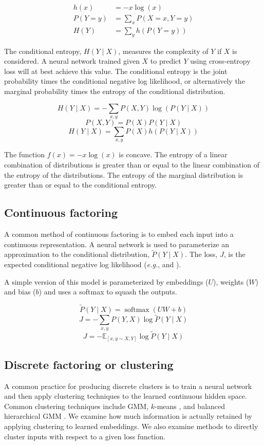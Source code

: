 \documentclass[11pt,letterpaper]{article}
\begin{document}
\begin{align*}
h(x) &= -x \log(x) \\
P(Y=y) &= \sum_x P(X=x, Y=y) \\
H(Y) &=  \sum_y h(P(Y=y))
\end{align*}

The conditional entropy, $H(Y \mid X)$, measures the complexity of $Y$ if $X$ is considered. A neural network trained given $X$ to predict $Y$ using cross-entropy loss will at best achieve this value. The conditional entropy is the joint probability times the conditional negative log likelihood, or alternatively the marginal probability times the entropy of the conditional distribution.

$$H(Y \mid X)=-\sum_{x,y} P(X, Y) \log(P(Y \mid X)) $$
$$P(X,Y) = P(X) P(Y \mid X)$$
$$H(Y \mid X)= \sum_{x,y}  P(X) h(P(Y \mid X))$$

The function $f(x)=-x \log(x)$ is concave. The entropy of a linear combination of distributions is greater than or equal to the linear combination of the entropy of the distributions. The entropy of the marginal distribution is greater than or equal to the conditional entropy.

\subsection{Continuous factoring}

A common method of continuous factoring is to embed each input into a continuous representation. A neural network is used to parameterize an approximation to the conditional distribution, $\tilde{P}(Y \mid X)$. The loss, $J$, is the expected conditional negative log likelihood (\textit{e.g.}, \cite{MikolovSCCD13} and \cite{Mikolov1301}).

A simple version of this model is parameterized by embeddings ($U$), weights ($W$) and bias ($b$) and uses a softmax to squash the outputs.

$$ \tilde{P}(Y\mid X) = \operatorname{softmax}(U W+b)$$
$$ J = -\sum_{x, y} P(Y,X) \log \tilde{P}(Y \mid X) $$
$$ J = -\mathbb{E}_{[x,y \sim X, Y]} \log \tilde{P}(Y \mid X) $$

\subsection{Discrete factoring or clustering}

A common practice for producing discrete clusters is to train a neural network and then apply clustering techniques to the learned continuous hidden space. Common clustering techniques include GMM, $k$-means \cite{Lloyd:2006:LSQ:2263356.2269955}, and balanced hierarchical GMM \cite{NIPS2008_3583}. We examine how much information is actually retained by applying clustering to learned embeddings. We also examine methods to directly cluster inputs with respect to a given loss function.
\end{document}
